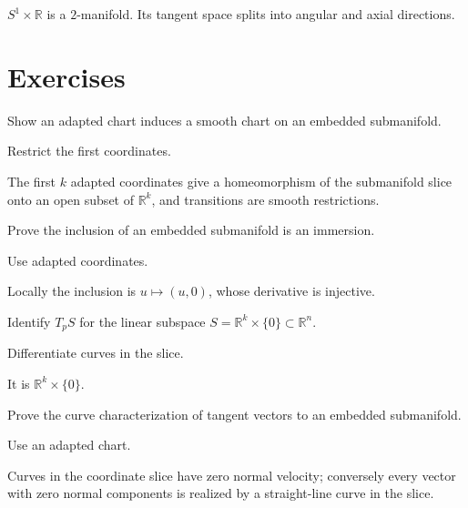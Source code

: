 \begin{example}[Cylinder]\label{ex:vii06-cylinder}
\(S^1\times\mathbb R\) is a \(2\)-manifold. Its tangent space splits into angular and axial directions.
\end{example}

\section{Exercises}
\begin{exercise}\label{exr:vii06-01}
Show an adapted chart induces a smooth chart on an embedded submanifold.
\end{exercise}
\begin{hint}
Restrict the first coordinates.
\end{hint}
\begin{solution}
The first \(k\) adapted coordinates give a homeomorphism of the submanifold slice onto an open subset of \(\mathbb R^k\), and transitions are smooth restrictions.
\end{solution}

\begin{exercise}\label{exr:vii06-02}
Prove the inclusion of an embedded submanifold is an immersion.
\end{exercise}
\begin{hint}
Use adapted coordinates.
\end{hint}
\begin{solution}
Locally the inclusion is \(u\mapsto(u,0)\), whose derivative is injective.
\end{solution}

\begin{exercise}\label{exr:vii06-03}
Identify \(T_pS\) for the linear subspace \(S=\mathbb R^k\times\{0\}\subset\mathbb R^n\).
\end{exercise}
\begin{hint}
Differentiate curves in the slice.
\end{hint}
\begin{solution}
It is \(\mathbb R^k\times\{0\}\).
\end{solution}

\begin{exercise}\label{exr:vii06-04}
Prove the curve characterization of tangent vectors to an embedded submanifold.
\end{exercise}
\begin{hint}
Use an adapted chart.
\end{hint}
\begin{solution}
Curves in the coordinate slice have zero normal velocity; conversely every vector with zero normal components is realized by a straight-line curve in the slice.
\end{solution}

